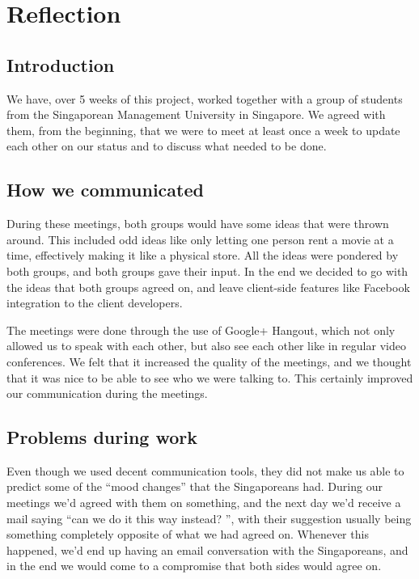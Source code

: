 \documentclass[11pt, danish, a4paper, oneside]{report}
\begin{document}
\chapter{Reflection}
\section*{Introduction}
\label{reflection_introduction}
We have, over 5 weeks of this project, worked together with a group of students from the Singaporean Management University in Singapore. We agreed with them, from the beginning, that we were to meet at least once a week to update each other on our status and to discuss what needed to be done.

\section*{How we communicated}
\label{reflection_communicated}
During these meetings, both groups would have some ideas that were thrown around. This included odd ideas like only letting one person rent a movie at a time, effectively making it like a physical store. All the ideas were pondered by both groups, and both groups gave their input. In the end we decided to go with the ideas that both groups agreed on, and leave client-side features like Facebook integration to the client developers.

The meetings were done through the use of Google+ Hangout, which not only allowed us to speak with each other, but also see each other like in regular video conferences. We felt that it increased the quality of the meetings, and we thought that it was nice to be able to see who we were talking to. This certainly improved our communication during the meetings.

\section*{Problems during work}
\label{reflection_problems}
Even though we used decent communication tools, they did not make us able to predict some of the ``mood changes'' that the Singaporeans had. During our meetings we'd agreed with them on something, and the next day we'd receive a mail saying ``can we do it this way instead? '', with their suggestion usually being something completely opposite of what we had agreed on. Whenever this happened, we'd end up having an email conversation with the Singaporeans, and in the end we would come to a compromise that both sides would agree on.
\end{document}
